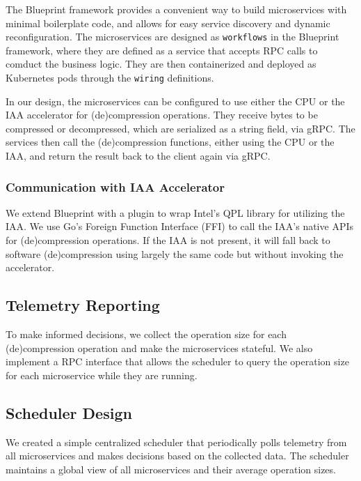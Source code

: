 The Blueprint framework provides a convenient way to build microservices with minimal boilerplate code, and allows for easy service discovery and dynamic reconfiguration.
The microservices are designed as \texttt{workflows} in the Blueprint framework, where they are defined as a service that accepts RPC calls to comduct the business logic.
They are then containerized and deployed as Kubernetes pods through the \texttt{wiring} definitions.

In our design, the microservices can be configured to use either the CPU or the IAA accelerator for (de)compression operations.
They receive bytes to be compressed or decompressed, which are serialized as a string field, via gRPC.
The services then call the (de)compression functions, either using the CPU or the IAA, and return the result back to the client again via gRPC.

\subsubsection{Communication with IAA Accelerator}

We extend Blueprint with a plugin to wrap Intel's QPL library \cite{intelIntelQpl2025} for utilizing the IAA.
We use Go's Foreign Function Interface (FFI) to call the IAA's native APIs for (de)compression operations.
If the IAA is not present, it will fall back to software (de)compression using largely the same code but without invoking the accelerator.

\subsection{Telemetry Reporting}

To make informed decisions, we collect the operation size for each (de)compression operation and make the microservices stateful.
We also implement a RPC interface that allows the scheduler to query the operation size for each microservice while they are running.

\subsection{Scheduler Design}

We created a simple centralized scheduler that periodically polls telemetry from all microservices and makes decisions based on the collected data.
The scheduler maintains a global view of all microservices and their average operation sizes.


